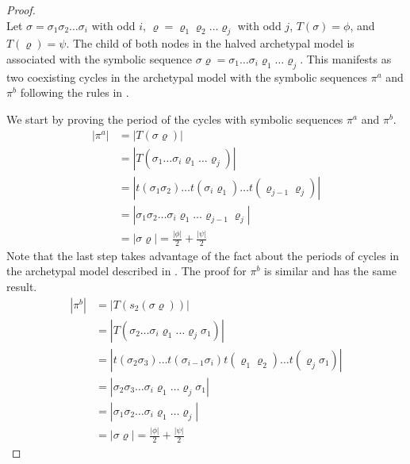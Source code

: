 \begin{proof} \phantom{x} \\
	Let $\sigma = \sigma_1\sigma_2 \dots \sigma_i$ with odd $i$, $\varrho = \varrho_1\varrho_2 \dots \varrho_j$ with odd $j$, $T(\sigma) = \phi$, and $T(\varrho) = \psi$.
	The child of both nodes in the halved archetypal model is associated with the symbolic sequence $\sigma\varrho = \sigma_1 \dots \sigma_i \varrho_1 \dots \varrho_j$.
	This manifests as two coexisting cycles in the archetypal model with the symbolic sequences $\pi^a$ and $\pi^b$ following the rules in .


	We start by proving the period of the cycles with symbolic sequences $\pi^a$ and $\pi^b$.
	\begin{align*}
		|\pi^a| & = |T(\sigma\varrho)|                                                               \\
		        & = |T(\sigma_1 \dots \sigma_i \varrho_1 \dots \varrho_j)|                           \\
		        & = |t(\sigma_1\sigma_2) \dots t(\sigma_i\varrho_1) \dots t(\varrho_{j-1}\varrho_j)| \\
		        & = |\sigma_1\sigma_2 \dots \sigma_i \varrho_1 \dots \varrho_{j-1}\varrho_j|         \\
		        & = |\sigma\varrho| = \frac{|\phi|}{2} + \frac{|\psi|}{2}
	\end{align*}
	Note that the last step takes advantage of the fact about the periods of cycles in the archetypal model described in .
	The proof for $\pi^b$ is similar and has the same result.
	\begin{align*}
		|\pi^b| & = |T(s_2(\sigma\varrho))|                                                                              \\
		        & = |T(\sigma_2 \dots \sigma_i \varrho_1 \dots \varrho_j \sigma_1)|                                      \\
		        & = |t(\sigma_2\sigma_3) \dots t(\sigma_{i-1}\sigma_i) t(\varrho_1\varrho_2) \dots t(\varrho_j\sigma_1)| \\
		        & = |\sigma_2\sigma_3 \dots \sigma_i \varrho_1 \dots \varrho_j \sigma_1|                                 \\
		        & = |\sigma_1\sigma_2 \dots \sigma_i \varrho_1 \dots \varrho_j|                                          \\
		        & = |\sigma\varrho| = \frac{|\phi|}{2} + \frac{|\psi|}{2}
	\end{align*}


\end{proof}
